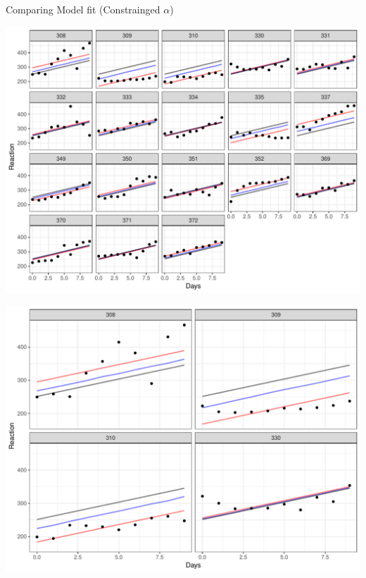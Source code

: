 \documentclass[11pt,ignorenonframetext,]{beamer}
\begin{document}
\begin{frame}{Comparing Model fit (Constrainged \(\alpha\))}

\includegraphics{Lec5_files/figure-beamer/unnamed-chunk-28-1.pdf}

\end{frame}

\begin{frame}{}

\includegraphics{Lec5_files/figure-beamer/unnamed-chunk-29-1.pdf}

\end{frame}
\end{document}
